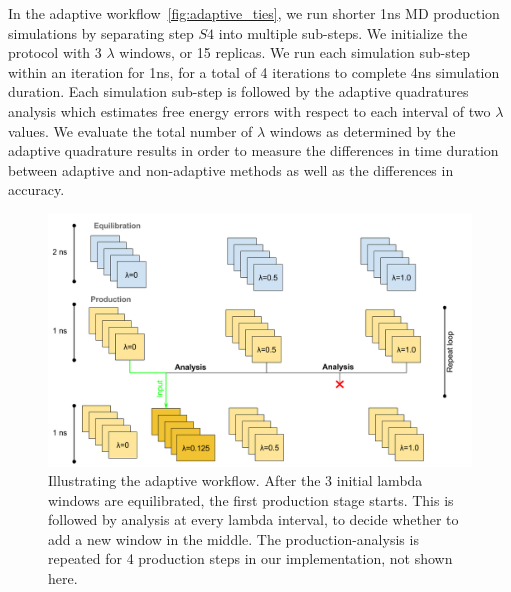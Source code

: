 In the adaptive workflow~\ref{fig:adaptive_ties}, we run shorter 1ns MD
production simulations by separating step $S4$ into multiple sub-steps. We 
initialize the protocol with 3 $\lambda$ windows, or 15 replicas. We run each 
simulation sub-step within an iteration for 1ns, for a total of 4 iterations to 
complete 4ns simulation duration. Each simulation sub-step is followed by the 
adaptive quadratures analysis
which estimates free energy errors with respect to each interval of
two $\lambda$ values. We evaluate the total number of $\lambda$ windows as 
determined by the adaptive quadrature results in order to measure the 
differences in time duration between adaptive and non-adaptive methods as well
as the differences in accuracy. 




\begin{figure}
  \centering
  \includegraphics[width=\columnwidth]{figures/Adaptive_TIES_1.png}
  \caption{Illustrating the adaptive workflow. After the 3
  initial lambda windows are equilibrated, the first production stage starts.
  This is followed by analysis at every lambda interval, to decide whether to
  add a new window in the middle. The production-analysis is repeated for 4
  production steps in our implementation, not shown here.}
\label{fig:adaptive_TIES}
\end{figure}

